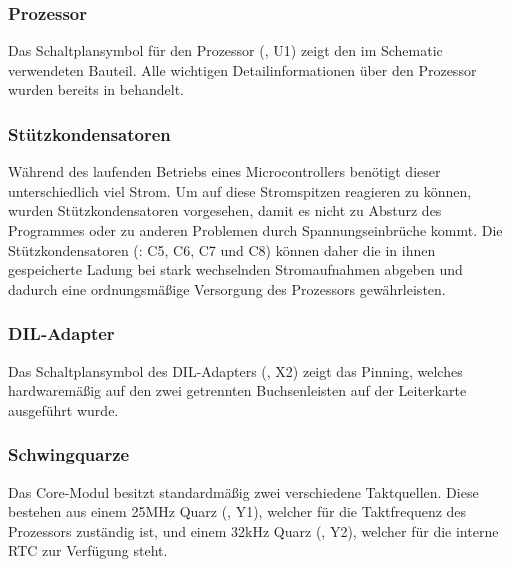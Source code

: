 \subsubsection{Prozessor}
Das Schaltplansymbol für den Prozessor (, U1) zeigt den im Schematic verwendeten Bauteil. Alle wichtigen Detailinformationen über den Prozessor wurden bereits in  behandelt.


\subsubsection{Stützkondensatoren}
Während des laufenden Betriebs eines Microcontrollers benötigt dieser unterschiedlich viel Strom. Um auf diese Stromspitzen reagieren zu können, wurden Stützkondensatoren vorgesehen, damit es nicht zu Absturz des Programmes oder zu anderen Problemen durch Spannungseinbrüche kommt. Die Stützkondensatoren (: C5, C6, C7 und C8) können daher die in ihnen gespeicherte Ladung bei stark wechselnden Stromaufnahmen abgeben und dadurch eine ordnungsmäßige Versorgung des Prozessors gewährleisten.


\subsubsection{DIL-Adapter}
Das Schaltplansymbol des DIL-Adapters (, X2) zeigt das Pinning, welches hardwaremäßig auf den zwei getrennten Buchsenleisten auf der Leiterkarte ausgeführt wurde.


\subsubsection{Schwingquarze}
Das \gls{Core-Modul} besitzt standardmäßig zwei verschiedene Taktquellen. Diese bestehen aus einem 25MHz Quarz (, Y1), welcher für die Taktfrequenz des Prozessors zuständig ist, und einem 32kHz Quarz (, Y2), welcher für die interne \gls{RTC} zur Verfügung steht.

